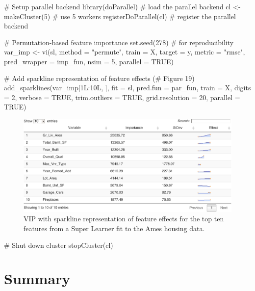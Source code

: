 \begin{Schunk}
\begin{Sinput}
# Setup parallel backend
library(doParallel) # load the parallel backend
cl <- makeCluster(5) # use 5 workers
registerDoParallel(cl) # register the parallel backend

# Permutation-based feature importance
set.seed(278)  # for reproducibility
var_imp <- vi(sl, method = "permute", train = X, target = y, metric = "rmse",
              pred_wrapper = imp_fun, nsim = 5, parallel = TRUE)

# Add sparkline representation of feature effects (# Figure 19)
add_sparklines(var_imp[1L:10L, ], fit = sl, pred.fun = par_fun, train = X,
               digits = 2, verbose = TRUE, trim.outliers = TRUE,
               grid.resolution = 20, parallel = TRUE)
\end{Sinput}
\begin{figure}[!htb]

{\centering \includegraphics[width=1\linewidth]{greenwell-boehmke_files/figure-latex/ames-sparklines-1}

}

\caption[VIP with sparkline representation of feature effects for the top ten features from a Super Learner fit to the Ames housing data]{VIP with sparkline representation of feature effects for the top ten features from a Super Learner fit to the Ames housing data.}\label{fig:ames-sparklines}
\end{figure}
\begin{Sinput}
# Shut down cluster
stopCluster(cl)
\end{Sinput}
\end{Schunk}

\section{Summary}


